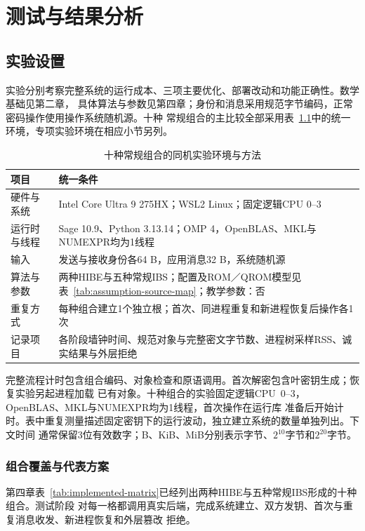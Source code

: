 \chapter{测试与结果分析}

\section{实验设置}
实验分别考察完整系统的运行成本、三项主要优化、部署改动和功能正确性。数学基础见第二章，
具体算法与参数见第四章；身份和消息采用规范字节编码，正常密码操作使用操作系统随机源。十种
常规组合的主比较全部采用表~\ref{tab:environments}中的统一环境，专项实验环境在相应小节另列。

\begin{table}[H]
\centering\small
\caption{十种常规组合的同机实验环境与方法}
\label{tab:environments}
\begin{tabularx}{\textwidth}{@{}p{}X@{}}
\toprule
\rowcolor{black!8} 项目 & 统一条件 \\
\midrule
硬件与系统 & Intel Core Ultra 9 275HX；WSL2 Linux；固定逻辑CPU 0--3 \\
运行时与线程 & Sage 10.9、Python 3.13.14；OMP 4，OpenBLAS、MKL与NUMEXPR均为1线程 \\
输入 & 发送与接收身份各64 B，应用消息32 B，系统随机源 \\
算法与参数 & 两种HIBE与五种常规IBS；配置及ROM／QROM模型见表~\ref{tab:assumption-source-map}；教学参数：否 \\
重复方式 & 每种组合建立1个独立根；首次、同进程重复和新进程恢复后操作各1次 \\
记录项目 & 各阶段墙钟时间、规范对象与完整密文字节数、进程树采样RSS、诚实结果与外层拒绝 \\
\bottomrule
\end{tabularx}
\end{table}

完整流程计时包含组合编码、对象检查和原语调用。首次解密包含叶密钥生成；恢复实验另起进程加载
已有对象。十种组合的实验固定逻辑CPU~0--3，OpenBLAS、MKL与NUMEXPR均为1线程，首次操作在运行库
准备后开始计时。表中重复测量描述固定密钥下的运行波动，独立建立系统的数量单独列出。下文时间
通常保留3位有效数字；B、KiB、MiB分别表示字节、$2^{10}$字节和$2^{20}$字节。

\subsection{组合覆盖与代表方案}

第四章表~\ref{tab:implemented-matrix}已经列出两种HIBE与五种常规IBS形成的十种组合。测试阶段
对每一格都调用真实后端，完成系统建立、双方发钥、首次与重复消息收发、新进程恢复和外层篡改
拒绝。

